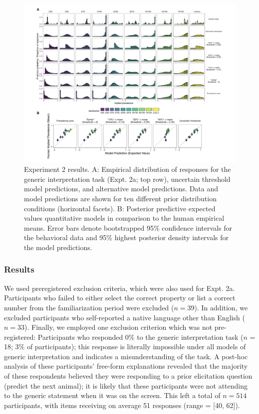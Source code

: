 \documentclass[floatsintext,doc]{apa6}
\begin{document}
\begin{figure}
\centering
\includegraphics{figs/expt2_model-results_nozero.pdf}
\caption{\label{fig:genint-modelingResults2}Experiment 2 results. A: Empirical distribution of responses for the generic interpretation task (Expt. 2a; top row), uncertain threshold model predictions, and alternative model predictions. Data and model predictions are shown for ten different prior distribution conditions (horizontal facets). B: Posterior predictive expected values quantitative models in comparison to the human empirical means. Error bars denote bootstrapped 95\% confidence intervals for the behavioral data and 95\% highest posterior density intervals for the model predictions.}
\end{figure}



\hypertarget{results-2}{%
\subsubsection{Results}\label{results-2}}

We used preregistered exclusion criteria, which were also used for Expt. 2a.
Participants who failed to either select the correct property or list a correct number from the familiarization period were excluded (\(n = 39\)).
In addition, we excluded participants who self-reported a native language other than English (\(n = 33\)).
Finally, we employed one exclusion criterion which was not pre-registered: Participants who responded 0\% to the generic interpretation task ($n$ = 18; 3\% of participants); this response is literally impossible under all models of generic interpretation and indicates a misunderstanding of the task. 
A post-hoc analysis of these participants' free-form explanations revealed that the majority of these respondents believed they were responding to a prior elicitation question (predict the next animal); it is likely that these participants were not attending to the generic statement when it was on the screen.
This left a total of \(n = 514\) participants, with items receiving on average 51 responses (range = {[}40, 62{]}).
\end{document}
